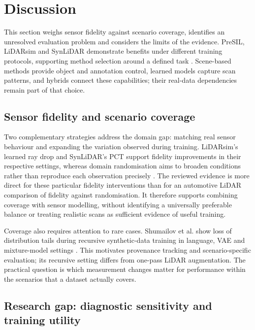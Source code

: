 \section{Discussion}
\label{sec:discussion}

This section weighs sensor fidelity against scenario coverage, identifies
an unresolved evaluation problem and considers the limits of the evidence.
PreSIL, LiDARsim and SynLiDAR demonstrate benefits under different training
protocols, supporting method selection around a defined task
\parencite{hurlPreciseSyntheticImage2019,manivasagamLiDARsimRealisticLiDAR2020,
xiaoTransferLearningSynthetic2022}. Scene-based methods provide object and
annotation control, learned models capture scan patterns, and hybrids connect
these capabilities; their real-data dependencies remain part of that choice.

\subsection{Sensor fidelity and scenario coverage}

Two complementary strategies address the domain gap: matching real sensor
behaviour and expanding the variation observed during training. LiDARsim's
learned ray drop and SynLiDAR's PCT support fidelity improvements in their
respective settings, whereas domain randomisation aims to broaden conditions
rather than reproduce each observation precisely
\parencite{manivasagamLiDARsimRealisticLiDAR2020,xiaoTransferLearningSynthetic2022,
nikolenkoSyntheticDataDeep2019}. The reviewed evidence is more direct for
these particular fidelity interventions than for an automotive LiDAR
comparison of fidelity against randomisation. It therefore supports combining
coverage with sensor modelling, without identifying a universally preferable
balance or treating realistic scans as sufficient evidence of useful training.

Coverage also requires attention to rare cases. Shumailov et al. show loss
of distribution tails during recursive synthetic-data training in language,
VAE and mixture-model settings \parencite{shumailovAIModelsCollapse2024}.
This motivates provenance tracking and scenario-specific evaluation; its
recursive setting differs from one-pass LiDAR augmentation. The practical
question is which measurement changes matter for performance within the
scenarios that a dataset actually covers.

\subsection{Research gap: diagnostic sensitivity and training utility}
\label{sec:research-gap}

